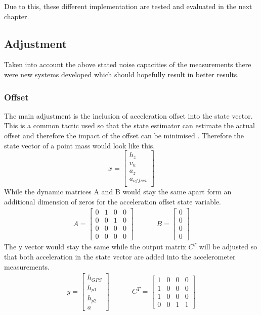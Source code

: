Due to this, these different implementation are tested and evaluated in the next chapter.
\subsection{Adjustment}
Taken into account the above stated noise capacities of the measurements there were new systems developed which should hopefully result in better results.
\subsubsection{Offset}
The main adjustment is the inclusion of acceleration offset into the state vector.
This is a common tactic used so that the state estimator can estimate the actual offset and therefore the impact of the offset can be minimised \cite{DavidWSchultz2004}.
Therefore the state vector of a point mass would look like this.
$$ x = \begin{bmatrix}
        h_z \\
        v_u \\
        a_z \\
        a_{offset} \\
       \end{bmatrix}
$$
While the dynamic matrices A and B would stay the same apart form an additional dimension of zeros for the acceleration offset state variable.
\begin{align*}
 A = \begin{bmatrix}
      0 & 1 & 0 & 0 \\
      0 & 0 & 1 & 0 \\
      0 & 0 & 0 & 0 \\
      0 & 0 & 0 & 0
     \end{bmatrix}
     & \hspace{1cm}
 B = \begin{bmatrix}
      0 \\
      0 \\
      0 \\
      0
     \end{bmatrix}
\end{align*}
The y vector would stay the same while the output matrix $C^T$ will be adjusted so that both acceleration in the state vector are added into the accelerometer measurements.
\begin{align*}
 y = \begin{bmatrix}
      h_{GPS} \\
      h_{p1} \\
      h_{p2} \\
      a
     \end{bmatrix}
     & \hspace{1cm}
 C^T = \begin{bmatrix}
      1 & 0 & 0 & 0 \\
      1 & 0 & 0 & 0 \\
      1 & 0 & 0 & 0 \\
      0 & 0 & 1 & 1
     \end{bmatrix}
\end{align*}

